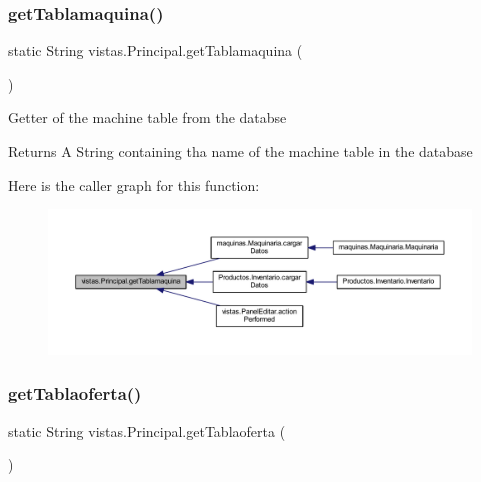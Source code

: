 \subsubsection{\texorpdfstring{get\+Tablamaquina()}{getTablamaquina()}}
{\footnotesize\ttfamily static String vistas.\+Principal.\+get\+Tablamaquina (\begin{DoxyParamCaption}{ }\end{DoxyParamCaption})\hspace{0.3cm}{\ttfamily [static]}}

Getter of the machine table from the databse \begin{DoxyReturn}{Returns}
A String containing tha name of the machine table in the database 
\end{DoxyReturn}
Here is the caller graph for this function\+:
\nopagebreak
\begin{figure}[H]
\begin{center}
\leavevmode
\includegraphics[width=350pt]{classvistas_1_1_principal_ac784d0415cbb5e3932f088d68876c91a_icgraph}
\end{center}
\end{figure}
\mbox{\label{classvistas_1_1_principal_afe7ddf018ad429301b1aca1dbfc4770d}} 
\subsubsection{\texorpdfstring{get\+Tablaoferta()}{getTablaoferta()}}
{\footnotesize\ttfamily static String vistas.\+Principal.\+get\+Tablaoferta (\begin{DoxyParamCaption}{ }\end{DoxyParamCaption})\hspace{0.3cm}{\ttfamily [static]}}

